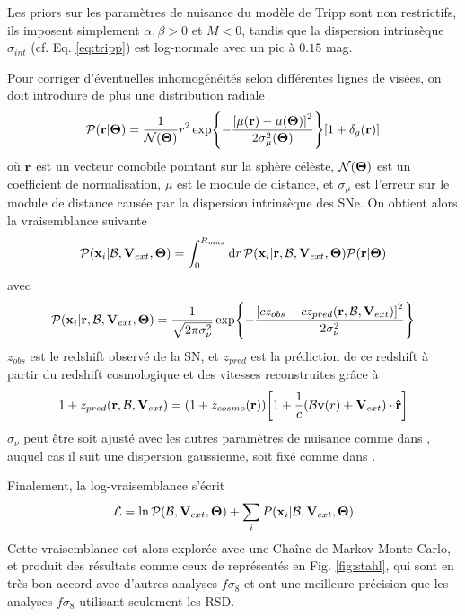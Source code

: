 \documentclass{book}
\let\mcl\mathcal
\begin{document}
Les priors sur les paramètres de nuisance du modèle de Tripp sont non restrictifs, ils imposent simplement $\alpha, \beta > 0$ et $M < 0$, tandis que la dispersion intrinsèque $\sigma_{int}$ (cf. Eq. \ref{eq:tripp}) est log-normale avec un pic à $0.15$ mag.

Pour corriger d'éventuelles inhomogénéités selon différentes lignes de visées, on doit introduire de plus une distribution radiale
\begin{equation}
    \mcl P(\vb r|\vb \Theta) = \frac{1}{\mcl N(\vb \Theta)} r^2 \exp{- \frac{\qty[\mu(\vb r) - \mu(\vb\Theta)]^2}{2 \sigma_\mu^2(\vb \Theta)}} \qty[1 + \delta_g(\vb r)]
\end{equation}
où $\vb r$ est un vecteur comobile pointant sur la sphère célèste, $\mcl N(\vb \Theta)$ est un coefficient de normalisation, $\mu$ est le module de distance, et $\sigma_\mu$ est l'erreur sur le module de distance causée par la dispersion intrinsèque des SNe. On obtient alors la vraisemblance suivante
\begin{equation}
    \mcl P(\vb x_i|\mcl B, \vb V_{ext}, \vb \Theta) = \int_0^{R_{max}} \dd{r} \mcl P (\vb x_i|\vb r, \mcl B, \vb V_{ext}, \vb \Theta) \mcl P(\vb r|\vb \Theta)
\end{equation}
avec
\begin{equation}
     \mcl P (\vb x_i|\vb r, \mcl B, \vb V_{ext}, \vb \Theta) = \frac{1}{\sqrt{2 \pi \sigma_\nu^2}} \exp{-\frac{\qty[c z_{obs} - cz_{pred}(\vb r, \mcl B, \vb V_{ext})]^2}{2\sigma_\nu^2}}
\end{equation}
$z_{obs}$ est le redshift observé de la SN, et $z_{pred}$ est la prédiction de ce redshift à partir du redshift cosmologique et des vitesses reconstruites grâce à
\begin{equation}
    1 + z_{pred}(\vb r, \mcl B, \vb V_{ext}) = (1 + z_{cosmo}(\vb r)) \qty[1 + \frac{1}{c} (\mcl B \vb v(r) + \vb V_{ext}) \cdot \vu r]
\end{equation}
$\sigma_\nu$ peut être soit ajusté avec les autres paramètres de nuisance comme dans \cite{stahl_peculiar-velocity_2021}, auquel cas il suit une dispersion gaussienne, soit fixé comme dans \cite{boruah_cosmic_2020}.

Finalement, la log-vraisemblance s'écrit
\begin{equation}
    \mcl L = \ln \mcl P(\mcl B, \vb V_{ext}, \vb \Theta) + \sum_i P(\vb x_i|\mcl B, \vb V_{ext}, \vb \Theta)
\end{equation}
Cette vraisemblance est alors explorée avec une Chaîne de Markov Monte Carlo, et produit des résultats comme ceux de \cite{stahl_peculiar-velocity_2021} représentés en Fig. \ref{fig:stahl}, qui sont en très bon accord avec d'autres analyses $f\sigma_8$ et ont une meilleure précision que les analyses $f\sigma_8$ utilisant seulement les RSD.
\end{document}
